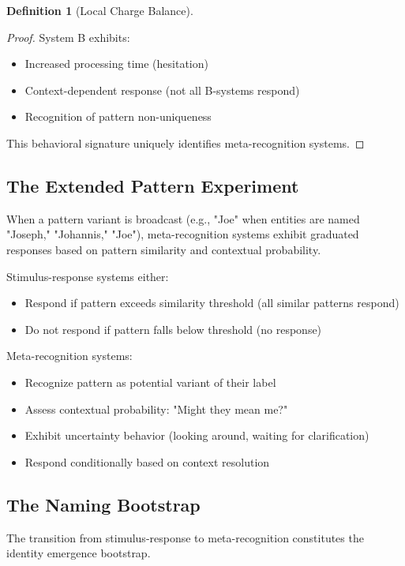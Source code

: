 \documentclass[12pt,a4paper]{article}
\theoremstyle{plain}
\theoremstyle{definition}
\newtheorem{definition}[theorem]{Definition}
\theoremstyle{remark}
\begin{document}
\begin{definition}[Local Charge Balance]
\begin{proof}
System B exhibits:
\begin{itemize}
\item Increased processing time (hesitation)
\item Context-dependent response (not all B-systems respond)
\item Recognition of pattern non-uniqueness
\end{itemize}

This behavioral signature uniquely identifies meta-recognition systems.
\end{proof}

\subsection{The Extended Pattern Experiment}

\begin{observation}
When a pattern variant is broadcast (e.g., "Joe" when entities are named "Joseph," "Johannis," "Joe"), meta-recognition systems exhibit graduated responses based on pattern similarity and contextual probability.

Stimulus-response systems either:
\begin{itemize}
\item Respond if pattern exceeds similarity threshold (all similar patterns respond)
\item Do not respond if pattern falls below threshold (no response)
\end{itemize}

Meta-recognition systems:
\begin{itemize}
\item Recognize pattern as potential variant of their label
\item Assess contextual probability: "Might they mean me?"
\item Exhibit uncertainty behavior (looking around, waiting for clarification)
\item Respond conditionally based on context resolution
\end{itemize}
\end{observation}

\subsection{The Naming Bootstrap}

The transition from stimulus-response to meta-recognition constitutes the identity emergence bootstrap.


\end{definition}
\end{document}
